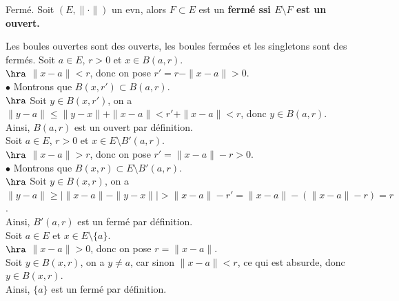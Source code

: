 \documentclass[11pt]{article}
\begin{document}
\vspace*{-0.8cm}

\begin{defi}{Fermé.}{}
    Soit $(E,\|\cdot\|)$ un evn, alors $F\subset E$ est un \bf{fermé} ssi $E\setminus F$ est un ouvert.
\end{defi}

\vspace*{-0.8cm}

\begin{prop}{}{}
    Les boules ouvertes sont des ouverts, les boules fermées et les singletons sont des fermés.
    \tcblower
     Soit $a\in E$, $r>0$ et $x\in B(a,r)$.\\
    $\hra$ $\|x-a\|<r$, donc on pose $r'=r-\|x-a\|>0$.\\
    $\bullet$ Montrons que $B(x,r')\subset B(a,r)$.\\
    $\hra$ Soit $y\in B(x,r')$, on a $\|y-a\|\leq \|y-x\|+\|x-a\| < r' + \|x-a\| < r$, donc $y\in B(a,r)$.\\
    Ainsi, $B(a,r)$ est un ouvert par définition.\\
     Soit $a\in E$, $r>0$ et $x\in E\setminus B'(a,r)$.\\
    $\hra$ $\|x-a\|>r$, donc on pose $r'=\|x-a\|-r>0$.\\
    $\bullet$ Montrons que $B(x,r)\subset E\setminus B'(a,r)$.\\
    $\hra$ Soit $y\in B(x,r)$, on a $\|y-a\| \geq |\|x-a\| - \|y-x\|| > \|x-a\| - r' = \|x-a\| - (\|x-a\| - r) = r$.\\
    Ainsi, $B'(a,r)$ est un fermé par définition.\\
     Soit $a\in E$ et $x\in E\setminus\{a\}$.\\
    $\hra$ $\|x-a\|>0$, donc on pose $r=\|x-a\|$.\\
    Soit $y\in B(x,r)$, on a $y\neq a$, car sinon $\|x-a\|<r$, ce qui est absurde, donc $y\in B(x,r)$.\\
    Ainsi, $\{a\}$ est un fermé par définition.
\end{prop}

\vspace*{-0.8cm}
\end{document}
